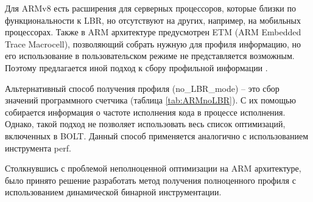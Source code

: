 \begin{table} [h]
\begin{threeparttable}
\begin{SingleSpace}
\begin{tabular}{| c | c | c | c | c | c | c | c | c |}
            \end{tabular}%
        \end{SingleSpace}
    \end{threeparttable}
\end{table}


Для ARMv8 есть расширения для серверных процессоров, которые близки по функциональности к LBR, но отсутствуют на других, например, на мобильных процессорах. Также в ARM архитектуре предусмотрен ETM (ARM Embedded Trace Macrocell), позволяющий собрать нужную для профиля информацию, но его использование в пользовательском режиме не представляется возможным. Поэтому предлагается иной подход к сбору профильной информации \cite{Fu2018}.

Альтернативный способ получения профиля (no\_LBR\_mode) – это сбор значений программного счетчика (таблица \cref{tab:ARMnoLBR}). С их помощью собирается информация о частоте исполнения кода в процессе исполнения. Однако, такой подход не позволяет использовать весь список оптимизаций, включенных в BOLT. Данный способ применяется аналогично с использованием инструмента perf.

Столкнувшись с проблемой неполноценной оптимизации на ARM архитектуре, было принято решение разработать метод получения полноценного профиля с использованием динамической бинарной инструментации.

\clearpage

